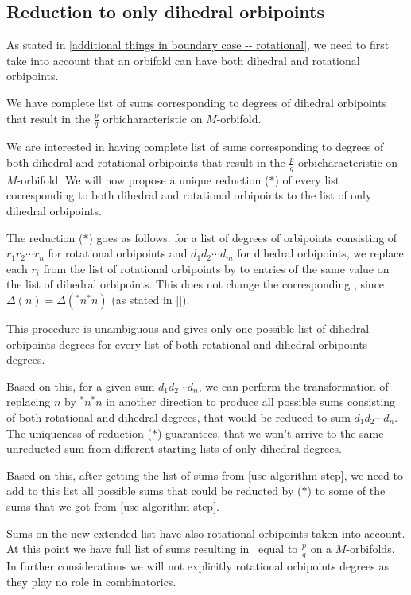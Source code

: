 \subsection{Reduction to only dihedral orbipoints}\label{reduction only to dihedral}
As stated in \ref{additional things in boundary case -- rotational}, we need to first 
take into account that an orbifold can have both dihedral and rotational orbipoints. 

We have complete list of sums corresponding to degrees of dihedral orbipoints that result in 
the $\frac{p}{q}$ orbicharacteristic on $M$-orbifold. 

We are interested in having complete list of sums corresponding to degrees of both dihedral 
and rotational 
orbipoints that result in 
the $\frac{p}{q}$ orbicharacteristic on $M$-orbifold. 
We will now propose a unique  
reduction ($\ast$) of every list corresponding to both dihedral and 
rotational orbipoints to the list of only dihedral orbipoints. 

The reduction ($\ast$) goes as follows: for a list of degrees of orbipoints consisting of 
$r_1r_2\cdots r_n$ for rotational orbipoints and $d_1d_2\cdots d_m$ for dihedral orbipoints, 
we replace each $r_i$ from the list of rotational orbipoints by to entries of the same 
value on the list of dihedral orbipoints. This does not change the 
corresponding \Eoc, since $\Delta(n) = \Delta(^*n^*n)$ (as stated in \ref{}). 

This procedure is unambiguous and gives only one possible list of dihedral orbipoints degrees 
for every list of both rotational and dihedral orbipoints degrees. 

Based on this, for a given sum $d_1d_2\cdots d_n$,
we can perform the transformation of replacing $n$ by $^*n^*n$ in another direction to 
produce all possible sums consisting of both rotational and dihedral degrees, that 
would be reduced to sum $d_1d_2\cdots d_n$. The uniqueness of reduction ($\ast$) guarantees, that 
we won't arrive to the same unreducted sum from different starting lists of only dihedral degrees.

Based on this, after getting the list of sums from \ref{use algorithm step}, we need to 
add to this list all possible sums that could be reducted by ($\ast$) to some 
of the sums that we got from \ref{use algorithm step}. 

Sums on the new extended list have also rotational orbipoints taken into account. 
At this point we have full list of sums resulting in \Eoc\ equal to $\frac{p}{q}$ on a 
$M$-orbifolds. 
In further considerations we will not explicitly rotational orbipoints degrees as they play 
no role in combinatorics.

